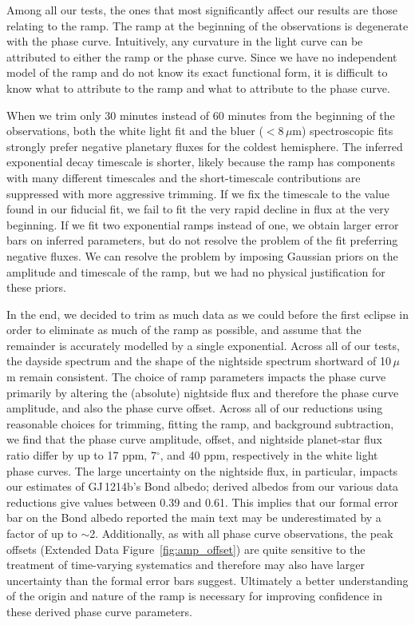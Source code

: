\documentclass[pdflatex,sn-standardnature]{sn-jnl}%
\begin{document}
Among all our tests, the ones that most significantly affect our results are those relating to the ramp.  The ramp at the beginning of the observations is degenerate with the phase curve.  Intuitively, any curvature in the light curve can be attributed to either the ramp or the phase curve.  Since we have no independent model of the ramp and do not know its exact functional form, it is difficult to know what to attribute to the ramp and what to attribute to the phase curve. 

When we trim only 30 minutes instead of 60 minutes from the beginning of the observations, both the white light fit and the bluer ($<$8\,$\mu$m) spectroscopic fits strongly prefer negative planetary fluxes for the coldest hemisphere.  The inferred exponential decay timescale is shorter, likely because the ramp has components with many different timescales and the short-timescale contributions are suppressed with more aggressive trimming.  If we fix the timescale to the value found in our fiducial fit, we fail to fit the very rapid decline in flux at the very beginning.  If we fit two exponential ramps instead of one, we obtain larger error bars on inferred parameters, but do not resolve the problem of the fit preferring negative fluxes.  We can resolve the problem by imposing Gaussian priors on the amplitude and timescale of the ramp, but we had no physical justification for these priors. 

In the end, we decided to trim as much data as we could before the first eclipse in order to eliminate as much of the ramp as possible, and assume that the remainder is accurately modelled by a single exponential.  Across all of our tests, the dayside spectrum and the shape of the nightside spectrum shortward of 10\,$\mu$m remain consistent.  The choice of ramp parameters impacts the phase curve primarily by altering the (absolute) nightside flux and therefore the phase curve amplitude, and also the phase curve offset.  Across all of our reductions using reasonable choices for trimming, fitting the ramp, and background subtraction, we find that the phase curve amplitude, offset, and nightside planet-star flux ratio differ by up to 17 ppm, 7$^\circ$, and 40 ppm, respectively in the white light phase curves.  The large uncertainty on the nightside flux, in particular, impacts our estimates of GJ\,1214b's Bond albedo; derived albedos from our various data reductions give values between 0.39 and 0.61.  This implies that our formal error bar on the Bond albedo reported the main text may be underestimated by a factor of up to $\sim$2.  Additionally, as with all phase curve observations, the peak offsets (Extended Data Figure~\ref{fig:amp_offset}) are quite sensitive to the treatment of time-varying systematics and therefore may also have larger uncertainty than the formal error bars suggest.  Ultimately a better understanding of the origin and nature of the ramp is necessary for improving confidence in these derived phase curve parameters.  
\end{document}
